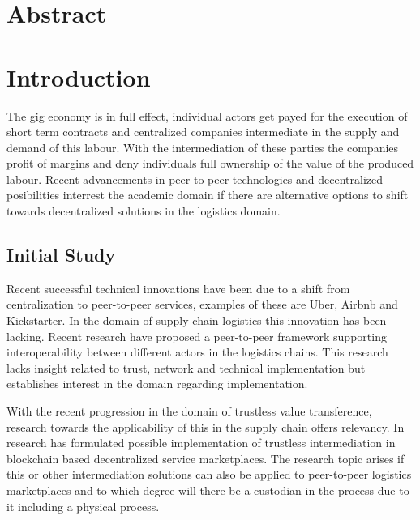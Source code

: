 \documentclass[Nomencl]{DylanMaster}
\begin{document}
\mytitlepage
\tableofcontents
\newpage

\section{Abstract}

\section{Introduction}

The gig economy is in full effect, individual actors get payed for the execution of short term contracts and centralized companies intermediate in the supply and demand of this labour. With the intermediation of these parties the companies profit of margins and deny individuals full ownership of the value of the produced labour. Recent advancements in peer-to-peer technologies and decentralized posibilities interrest the academic domain if there are alternative options to shift towards decentralized solutions in the logistics domain\cite{research_demand}\cite{research_demand}\cite{research_demand}.\par


\subsection{Initial Study}

Recent successful technical innovations have been due to a shift from centralization to peer-to-peer services, examples of these are Uber, Airbnb and Kickstarter. In the domain of supply chain logistics this innovation has been lacking. Recent research \cite{peer-to-peerDecentralizedLogistics} have proposed a peer-to-peer framework supporting interoperability between different actors in the logistics chains. This research lacks insight related to trust, network and technical implementation but establishes interest in the domain regarding implementation. \par
With the recent progression in the domain of trustless value transference, research towards the applicability of this in the supply chain offers relevancy. In \cite{trustlessIntermediationInBCServiceMarket} research has formulated possible implementation of trustless intermediation in blockchain based decentralized service marketplaces. The research topic arises if this or other intermediation solutions can also be applied to peer-to-peer logistics marketplaces and to which degree will there be a custodian in the process due to it including a physical process.
\end{document}
